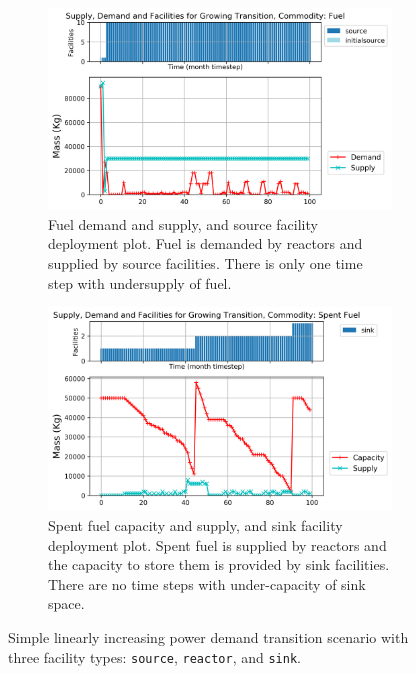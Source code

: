 \begin{figure}[]
    \centering
    \begin{subfigure}[t]{1\textwidth}
        \centering
        \includegraphics[width=\linewidth]{figures/growingtransition-fuel.png} 
        \caption{Fuel demand and supply, and source facility deployment plot.
        Fuel is demanded by reactors and supplied by source facilities.
        There is only one time step with undersupply of fuel.}
	    \label{fig:growingtransition-fuel}
    \end{subfigure}
    \begin{subfigure}[t]{1\textwidth}
        \centering
        \includegraphics[width=\linewidth]{figures/growingtransition-spentfuel.png} 
        \caption{Spent fuel capacity and supply, and sink facility deployment plot.
            Spent fuel is supplied by reactors and the capacity to store them 
            is provided by sink facilities.
        There are no time steps with under-capacity of sink space.}
        \label{fig:growingtransition-spentfuel}
    \end{subfigure}
    \caption{Simple linearly increasing power demand transition scenario with 
    three facility types: \texttt{source}, \texttt{reactor}, and \texttt{sink}.}
\end{figure}
